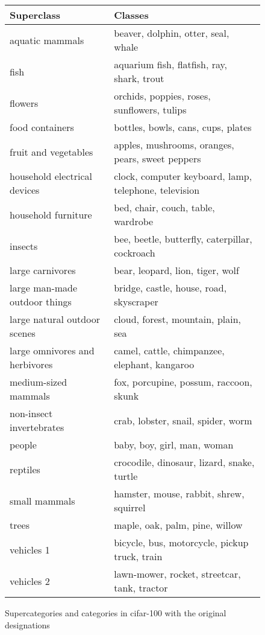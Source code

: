 \begin{figure}
    \begin{tabular} {l l} 
        \hline
        Superclass &	Classes\\
        \hline
        aquatic mammals & 	beaver, dolphin, otter, seal, whale\\
        fish & 	aquarium fish, flatfish, ray, shark, trout\\
        flowers & 	orchids, poppies, roses, sunflowers, tulips\\
        food containers &	bottles, bowls, cans, cups, plates\\
        fruit and vegetables &	apples, mushrooms, oranges, pears, sweet peppers\\
        household electrical devices &	clock, computer keyboard, lamp, telephone, television\\
        household furniture &	bed, chair, couch, table, wardrobe\\
        insects &	bee, beetle, butterfly, caterpillar, cockroach\\
        large carnivores &	bear, leopard, lion, tiger, wolf\\
        large man-made outdoor things &	bridge, castle, house, road, skyscraper\\
        large natural outdoor scenes &	cloud, forest, mountain, plain, sea\\
        large omnivores and herbivores &	camel, cattle, chimpanzee, elephant, kangaroo\\
        medium-sized mammals &	fox, porcupine, possum, raccoon, skunk\\
        non-insect invertebrates &	crab, lobster, snail, spider, worm\\
        people &	baby, boy, girl, man, woman\\
        reptiles &	crocodile, dinosaur, lizard, snake, turtle\\
        small mammals &	hamster, mouse, rabbit, shrew, squirrel\\
        trees &	maple, oak, palm, pine, willow\\
        vehicles 1 &	bicycle, bus, motorcycle, pickup truck, train\\
        vehicles 2 &	lawn-mower, rocket, streetcar, tank, tractor\\
    \end{tabular}
    \caption{Supercategories and categories in \ac{cifar}-100 with the original designations}
    \label{TabCIF100}
    
\end{figure}


